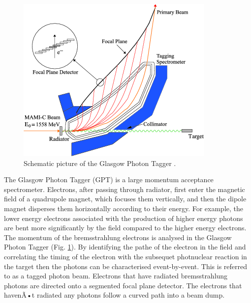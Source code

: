 \begin{figure}[H]
\begin{center}
\includegraphics[scale=0.8]{pictures/png/GlaTagger.png}
\caption{Schematic picture of the Glasgow Photon Tagger \cite{marcu}.}
\label{gpt}
\end{center}
\end{figure}

\indent The Glasgow Photon Tagger (GPT) is a large momentum acceptance spectrometer. Electrons, after passing through radiator, first enter the magnetic field of a quadrupole magnet, which focuses them vertically, and then the dipole magnet disperses them horizontally according to their energy. For example, the lower energy electrons associated with the production of higher energy photons are bent more significantly by the field compared to the higher energy electrons. The momentum of the bremsstrahlung electrons is analysed in the Glasgow Photon Tagger (Fig. \ref{gpt}). By identifying the pathe of the electron in the field and correlating the timing of the electron with the subsequet photnuclear reaction in the target then the photons can be characterised event-by-event. This is referred to as a tagged photon beam. Electrons that have radiated bremsstrahlung photons are directed onto a segmented focal plane detector. The electrons that havenÃ•t radiated any photons follow a curved path into a beam dump.

